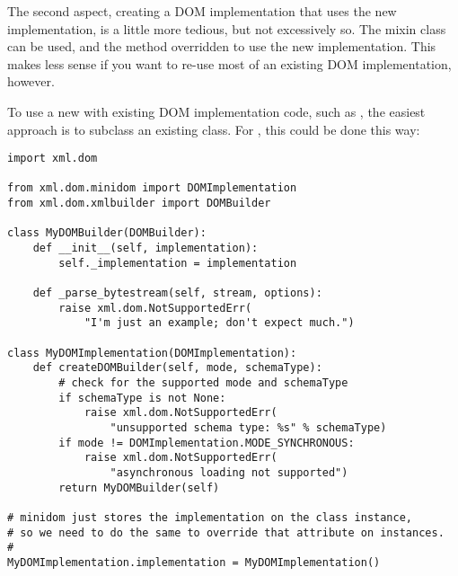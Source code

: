 \documentclass{howto}
\begin{document}
The second aspect, creating a DOM implementation that uses the new
 implementation, is a little more tedious, but not
excessively so.  The  mixin class can be
used, and the  method overridden to use the
new  implementation.  This makes less sense if you
want to re-use most of an existing DOM implementation, however.

To use a new  with existing DOM implementation code,
such as , the easiest approach is to subclass
an existing  class.  For
, this could be done this way:

\begin{verbatim}
import xml.dom

from xml.dom.minidom import DOMImplementation
from xml.dom.xmlbuilder import DOMBuilder

class MyDOMBuilder(DOMBuilder):
    def __init__(self, implementation):
        self._implementation = implementation

    def _parse_bytestream(self, stream, options):
        raise xml.dom.NotSupportedErr(
            "I'm just an example; don't expect much.")

class MyDOMImplementation(DOMImplementation):
    def createDOMBuilder(self, mode, schemaType):
        # check for the supported mode and schemaType
        if schemaType is not None:
            raise xml.dom.NotSupportedErr(
                "unsupported schema type: %s" % schemaType)
        if mode != DOMImplementation.MODE_SYNCHRONOUS:
            raise xml.dom.NotSupportedErr(
                "asynchronous loading not supported")
        return MyDOMBuilder(self)

# minidom just stores the implementation on the class instance,
# so we need to do the same to override that attribute on instances.
#
MyDOMImplementation.implementation = MyDOMImplementation()
\end{verbatim}
\end{document}

